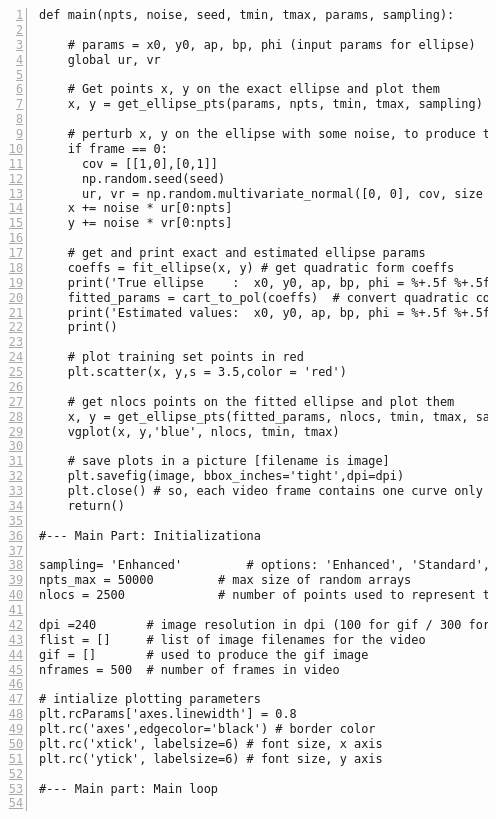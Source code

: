 \documentclass[oneside,10pt]{book}
\begin{document}
\begin{lstlisting}[numbers=left]
def main(npts, noise, seed, tmin, tmax, params, sampling):

    # params = x0, y0, ap, bp, phi (input params for ellipse)
    global ur, vr 

    # Get points x, y on the exact ellipse and plot them
    x, y = get_ellipse_pts(params, npts, tmin, tmax, sampling)

    # perturb x, y on the ellipse with some noise, to produce training set
    if frame == 0: 
      cov = [[1,0],[0,1]]  
      np.random.seed(seed)
      ur, vr = np.random.multivariate_normal([0, 0], cov, size = npts_max).T ### npts).T
    x += noise * ur[0:npts]  
    y += noise * vr[0:npts]  

    # get and print exact and estimated ellipse params
    coeffs = fit_ellipse(x, y) # get quadratic form coeffs
    print('True ellipse    :  x0, y0, ap, bp, phi = %+.5f %+.5f %+.5f %+.5f %+.5f' % params)
    fitted_params = cart_to_pol(coeffs)  # convert quadratic coeffs to params
    print('Estimated values:  x0, y0, ap, bp, phi = %+.5f %+.5f %+.5f %+.5f %+.5f' % fitted_params)
    print()

    # plot training set points in red
    plt.scatter(x, y,s = 3.5,color = 'red') 
 
    # get nlocs points on the fitted ellipse and plot them
    x, y = get_ellipse_pts(fitted_params, nlocs, tmin, tmax, sampling) 
    vgplot(x, y,'blue', nlocs, tmin, tmax)

    # save plots in a picture [filename is image]
    plt.savefig(image, bbox_inches='tight',dpi=dpi)  
    plt.close() # so, each video frame contains one curve only
    return()

#--- Main Part: Initializationa

sampling= 'Enhanced'         # options: 'Enhanced', 'Standard', 'Even' 
npts_max = 50000         # max size of random arrays
nlocs = 2500             # number of points used to represent true ellipse 

dpi =240       # image resolution in dpi (100 for gif / 300 for video)
flist = []     # list of image filenames for the video
gif = []       # used to produce the gif image
nframes = 500  # number of frames in video

# intialize plotting parameters
plt.rcParams['axes.linewidth'] = 0.8
plt.rc('axes',edgecolor='black') # border color
plt.rc('xtick', labelsize=6) # font size, x axis  
plt.rc('ytick', labelsize=6) # font size, y axis

#--- Main part: Main loop


\end{lstlisting}
\end{document}
